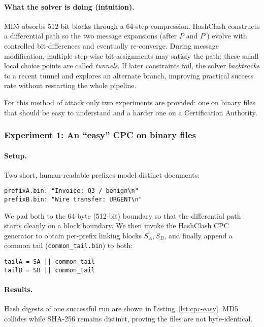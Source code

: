\documentclass[runningheads]{llncs}
\begin{document}
    \paragraph{What the solver is doing (intuition).}
    MD5 absorbs 512-bit blocks through a 64-step compression. HashClash constructs a differential path so the two message expansions (after \(P\) and \(P'\)) evolve with controlled bit-differences and eventually re-converge. During message modification, multiple step-wise bit assignments may satisfy the path; these small local choice points are called \emph{tunnels}. If later constraints fail, the solver \emph{backtracks} to a recent tunnel and explores an alternate branch, improving practical success rate without restarting the whole pipeline.

    For this method of attack only two experiments are provided: one on binary files that should be easy to understand and a harder one on a Certification Authority.

    \subsubsection{Experiment 1: An ``easy'' CPC on binary files}\label{par:CPC-easy}
    \paragraph{Setup.}
    Two short, human-readable prefixes model distinct documents:
    \begin{lstlisting}[style=textblock]
prefixA.bin: "Invoice: Q3 / benign\n"
prefixB.bin: "Wire transfer: URGENT\n"
    \end{lstlisting}
    We pad both to the 64-byte (512-bit) boundary so that the differential path starts cleanly on a block boundary. We then invoke the HashClash CPC generator to obtain per-prefix linking blocks \(S_A,S_B\), and finally append a common tail (\texttt{common\_tail.bin}) to both:
    \begin{lstlisting}[style=textblock]
tailA = SA || common_tail
tailB = SB || common_tail
    \end{lstlisting}

    \paragraph{Results.}
    Hash digests of one successful run are shown in Listing~\ref{lst:cpc-easy}. MD5 collides while SHA-256 remains distinct, proving the files are not byte-identical.
\end{document}
